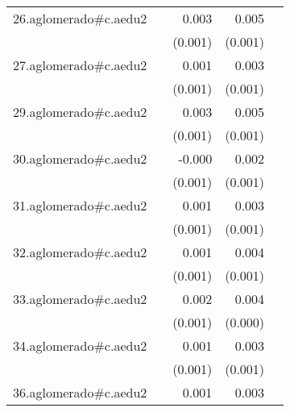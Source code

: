 {\begin{longtable}{l*{4}{D{.}{.}{-1}}}
\addlinespace
26.aglomerado#c.aedu2&                     &       0.003\sym{*}  &       0.005\sym{***}&                     \\
            &                     &     (0.001)         &     (0.001)         &                     \\
\addlinespace
27.aglomerado#c.aedu2&                     &       0.001         &       0.003\sym{***}&                     \\
            &                     &     (0.001)         &     (0.001)         &                     \\
\addlinespace
29.aglomerado#c.aedu2&                     &       0.003\sym{**} &       0.005\sym{***}&                     \\
            &                     &     (0.001)         &     (0.001)         &                     \\
\addlinespace
30.aglomerado#c.aedu2&                     &      -0.000         &       0.002         &                     \\
            &                     &     (0.001)         &     (0.001)         &                     \\
\addlinespace
31.aglomerado#c.aedu2&                     &       0.001         &       0.003\sym{*}  &                     \\
            &                     &     (0.001)         &     (0.001)         &                     \\
\addlinespace
32.aglomerado#c.aedu2&                     &       0.001         &       0.004\sym{***}&                     \\
            &                     &     (0.001)         &     (0.001)         &                     \\
\addlinespace
33.aglomerado#c.aedu2&                     &       0.002         &       0.004\sym{***}&                     \\
            &                     &     (0.001)         &     (0.000)         &                     \\
\addlinespace
34.aglomerado#c.aedu2&                     &       0.001         &       0.003\sym{**} &                     \\
            &                     &     (0.001)         &     (0.001)         &                     \\
\addlinespace
36.aglomerado#c.aedu2&                     &       0.001         &       0.003\sym{**} &                     \\

\end{longtable}}
